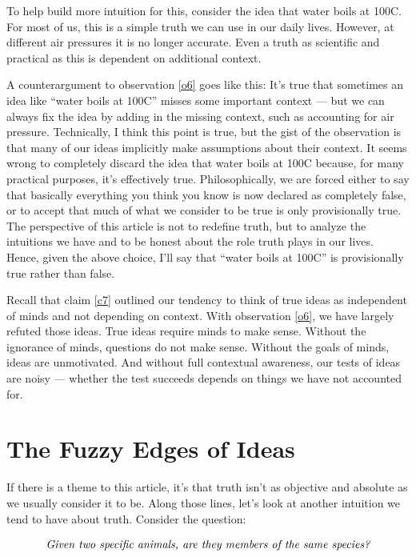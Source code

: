 \documentclass[11pt, oneside]{article}   	%
\begin{document}
To help build more intuition for this, consider the idea that water boils at
100\degree C. For most of us, this is a simple truth we can use in our daily
lives. However, at different air pressures it is no longer accurate. Even a
truth as scientific and practical as this is dependent on additional context.

A counterargument to observation \ref{o6} goes like this:
It's true that sometimes an idea like ``water boils at 100\degree C'' misses
some important context --- but we can always fix the idea by adding in the
missing context, such as accounting for air pressure.
Technically, I think this point is true, but the gist of the observation is that
many of our ideas implicitly make assumptions about their context. It seems
wrong to completely discard the idea that water boils at 100\degree C because,
for many practical purposes, it's effectively true. Philosophically, we are
forced either to say that
basically everything you think you know is now
declared as completely false, or to accept that much of what we consider to be
true is only provisionally true.
The perspective of this article is not to redefine truth, but to analyze the
intuitions we have and to be honest about the role truth plays in our lives.
Hence, given the above choice, I'll say that ``water boils at 100\degree C'' is
provisionally true rather than false.

Recall that claim \ref{c7} outlined our tendency to think of true ideas as
independent of minds and not depending on context. With observation \ref{o6}, we
have largely refuted those ideas.
True ideas require minds to make sense.
Without the ignorance of minds, questions do not make sense.
Without the goals of minds, ideas are unmotivated.
And without full contextual awareness, our tests of ideas are noisy ---
whether the test succeeds depends on things we have not accounted
for.

\section{The Fuzzy Edges of Ideas}

If there is a theme to this article, it's that truth isn't as
objective and absolute as we usually consider it to be.
Along those lines, let's
look at another intuition we tend to have about truth.
Consider the question:

\begin{equation}\label{eq4}
    \text{\em Given two specific animals, are they members of the same
    species?}
\end{equation}
\end{document}
